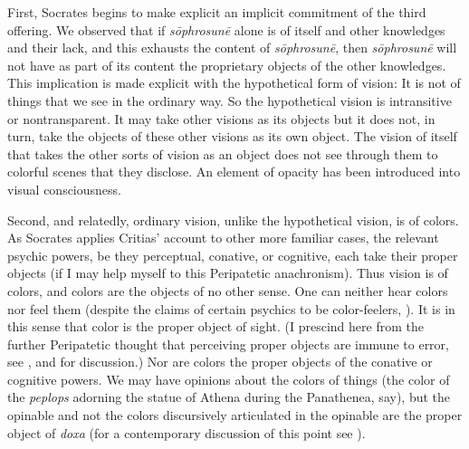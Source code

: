 First, Socrates begins to make explicit an implicit commitment of the third offering. We observed that if \emph{sōphrosunē} alone is of itself and other knowledges and their lack, and this exhausts the content of \emph{sōphrosunē}, then \emph{sōphrosunē} will not have as part of its content the proprietary objects of the other knowledges. This implication is made explicit with the hypothetical form of vision: It is not of things that we see in the ordinary way. So the hypothetical vision is intransitive or nontransparent. It may take other visions as its objects but it does not, in turn, take the objects of these other visions as its own object. The vision of itself that takes the other sorts of vision as an object does not see through them to colorful scenes that they disclose. An element of opacity has been introduced into visual consciousness.

Second, and relatedly, ordinary vision, unlike the hypothetical vision, is of colors. As Socrates applies Critias' account to other more familiar cases, the relevant psychic powers, be they perceptual, conative, or cognitive, each take their proper objects (if I may help myself to this Peripatetic anachronism). Thus vision is of colors, and colors are the objects of no other sense. One can neither hear colors nor feel them (despite the claims of certain psychics to be color-feelers, \citealt{Duplessis:1975aa}). It is in this sense that color is the proper object of sight. (I prescind here from the further Peripatetic thought that perceiving proper objects are immune to error, see \citealt[chapter 4.2]{Kalderon:2015fr}, and \citealt{Johnstone:2015aa} for discussion.) Nor are colors the proper objects of the conative or cognitive powers. We may have opinions about the colors of things (the color of the \emph{peplops} adorning the statue of Athena during the Panathenea, say), but the opinable and not the colors discursively articulated in the opinable are the proper object of \emph{doxa} (for a contemporary discussion of this point see \citealt[section 5]{Kalderon:2011fk}). 

